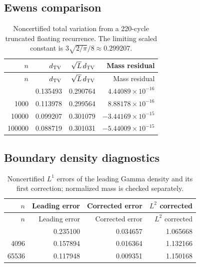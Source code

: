 \subsection{Ewens comparison}
\begin{longtable}{rrrr}
\caption{Noncertified total variation from a 220-cycle truncated floating recurrence. The limiting scaled constant is $3\sqrt{2/\pi}/8\approx0.299207$.}\label{tab:tv}\\
\toprule $n$ & $d_{\rm TV}$ & $\sqrt L\,d_{\rm TV}$ & Mass residual \\ \midrule
\endfirsthead
\toprule $n$ & $d_{\rm TV}$ & $\sqrt L\,d_{\rm TV}$ & Mass residual \\ \midrule
\endhead
\bottomrule\endfoot
100 & 0.135493 & 0.290764 & $4.44089\times10^{-16}$ \\
1000 & 0.113978 & 0.299564 & $8.88178\times10^{-16}$ \\
10000 & 0.099207 & 0.301079 & $-3.44169\times10^{-15}$ \\
100000 & 0.088719 & 0.301031 & $-5.44009\times10^{-15}$ \\
\end{longtable}
\subsection{Boundary density diagnostics}
\begin{longtable}{rrrr}
\caption{Noncertified $L^1$ errors of the leading Gamma density and its first correction; normalized mass is checked separately.}\label{tab:boundary}\\
\toprule $n$ & Leading error & Corrected error & $L^2$ corrected \\ \midrule
\endfirsthead
\toprule $n$ & Leading error & Corrected error & $L^2$ corrected \\ \midrule
\endhead
\bottomrule\endfoot
256 & 0.235100 & 0.034657 & 1.065668 \\
4096 & 0.157894 & 0.016364 & 1.132166 \\
65536 & 0.117948 & 0.009351 & 1.150168 \\
\end{longtable}
